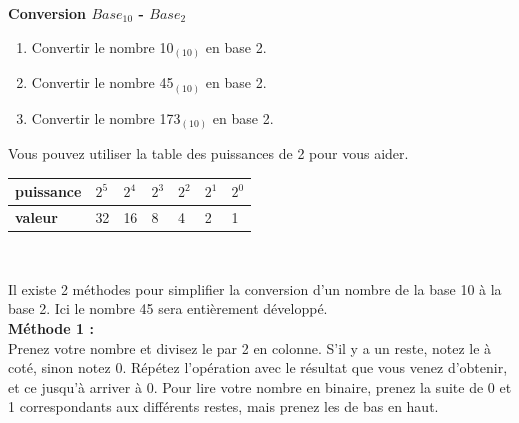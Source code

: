 \begin{Exercice}[5 minutes]  \textbf{Conversion $Base_{10}$ - $Base_2$}\\
    \begin{enumerate}
        \item Convertir le nombre 10$_{(10)}$ en base 2.
        \item Convertir le nombre 45$_{(10)}$ en base 2.
        \item Convertir le nombre 173$_{(10)}$ en base 2.
    \end{enumerate}

    \begin{conseil}
    
        Vous pouvez utiliser la table des puissances de 2 pour vous aider. \\
        
        \begin{tabular}{| C{0.1\textwidth} | C{0.1\textwidth} | C{0.1\textwidth} | C{0.1\textwidth} | C{0.1\textwidth} | C{0.1\textwidth} | C{0.1\textwidth} |} 
            \hline
            \textbf{puissance} & $2^{5}$ & $2^{4}$ & $2^{3}$ & $2^{2}$ & $2^{1}$ & $2^{0}$ \\ [0.5ex] 
            \hline
            \textbf{valeur} & 32 & 16 & 8 & 4 & 2 & 1 \\ [0.5ex] 
            \hline
        \end{tabular} \\
        
    \end{conseil}
    \begin{solution}
        Il existe 2 méthodes pour simplifier la conversion d'un nombre de la base 10 à la base 2. Ici le nombre 45 sera entièrement développé. \\
        
        
        \textbf{Méthode 1 :} \\
        
        
        Prenez votre nombre et divisez le par 2 en colonne. S'il y a un reste, notez le à coté, sinon notez 0. Répétez l'opération avec le résultat que vous venez d'obtenir, et ce jusqu'à arriver à 0. Pour lire votre nombre en binaire, prenez la suite de 0 et 1 correspondants aux différents restes, mais prenez les de bas en haut. \\
       	

\end{solution}
\end{Exercice}
